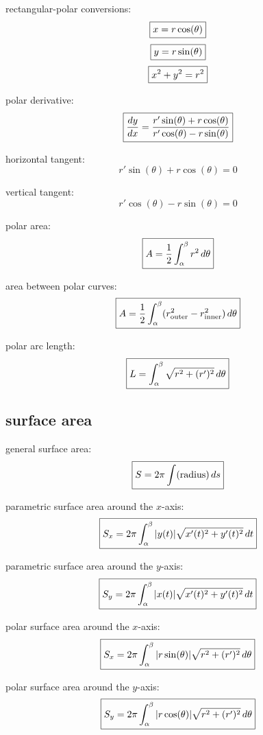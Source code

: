 \documentclass{article}
\newcommand{\mybox}[1]{\fbox{\ensuremath{\displaystyle #1}}}
\begin{document}
rectangular-polar conversions:
\[
\mybox{x=r\cos(\theta)}
\]
\[
\mybox{y=r\sin(\theta)}
\]
\[
\mybox{x^2+y^2=r^2}
\]

polar derivative:
\[
\mybox{
\frac{dy}{dx}
=
\frac{r'\sin(\theta)+r\cos(\theta)}
{r'\cos(\theta)-r\sin(\theta)}
}
\]

horizontal tangent:
\[
r'\sin(\theta)+r\cos(\theta)=0
\]

vertical tangent:
\[
r'\cos(\theta)-r\sin(\theta)=0
\]

polar area:
\[
\mybox{
A=\frac12\int_\alpha^\beta r^2\,d\theta
}
\]

area between polar curves:
\[
\mybox{
A=\frac12\int_\alpha^\beta
(r_{\mathrm{outer}}^2-r_{\mathrm{inner}}^2)\,d\theta
}
\]

polar arc length:
\[
\mybox{
L=\int_\alpha^\beta
\sqrt{r^2+(r')^2}\,d\theta
}
\]

\subsection{surface area}

general surface area:
\[
\mybox{S=2\pi\int(\mathrm{radius})\,ds}
\]

parametric surface area around the $x$-axis:
\[
\mybox{
S_x=2\pi\int_\alpha^\beta
|y(t)|\sqrt{x'(t)^2+y'(t)^2}\,dt
}
\]

parametric surface area around the $y$-axis:
\[
\mybox{
S_y=2\pi\int_\alpha^\beta
|x(t)|\sqrt{x'(t)^2+y'(t)^2}\,dt
}
\]

polar surface area around the $x$-axis:
\[
\mybox{
S_x=2\pi\int_\alpha^\beta
|r\sin(\theta)|\sqrt{r^2+(r')^2}\,d\theta
}
\]

polar surface area around the $y$-axis:
\[
\mybox{
S_y=2\pi\int_\alpha^\beta
|r\cos(\theta)|\sqrt{r^2+(r')^2}\,d\theta
}
\]
\end{document}
